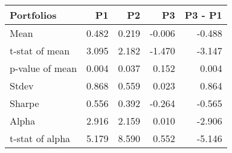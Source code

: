 \begin{tabular}{lrrrr}
\toprule
Portfolios & P1 & P2 & P3 & P3 - P1 \\
\midrule
Mean & 0.482 & 0.219 & -0.006 & -0.488 \\
t-stat of mean & 3.095 & 2.182 & -1.470 & -3.147 \\
p-value of mean & 0.004 & 0.037 & 0.152 & 0.004 \\
Stdev & 0.868 & 0.559 & 0.023 & 0.864 \\
Sharpe & 0.556 & 0.392 & -0.264 & -0.565 \\
Alpha & 2.916 & 2.159 & 0.010 & -2.906 \\
t-stat of alpha & 5.179 & 8.590 & 0.552 & -5.146 \\
\bottomrule
\end{tabular}
